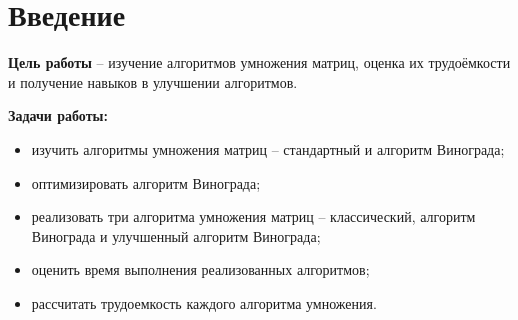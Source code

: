 \chapter*{Введение}

\textbf{Цель работы} – изучение алгоритмов умножения матриц, оценка их трудоёмкости и получение навыков в улучшении алгоритмов.

\textbf{Задачи работы:}
\begin{itemize}
	\item изучить алгоритмы умножения матриц -- стандартный и алгоритм Винограда; 
	\item оптимизировать алгоритм Винограда; 
	\item реализовать три алгоритма умножения матриц -- классический, алгоритм Винограда и улучшенный алгоритм Винограда; 
	\item оценить время выполнения реализованных алгоритмов;
	\item рассчитать трудоемкость каждого алгоритма умножения.
\end{itemize}


